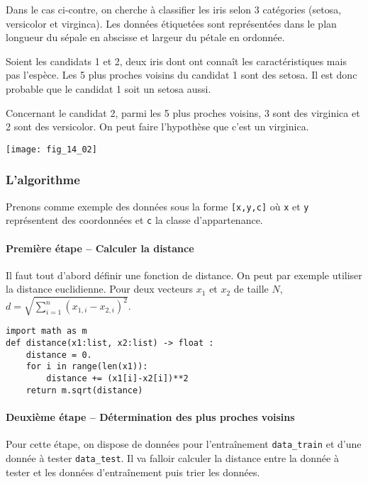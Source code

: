 {\begin{exemple}
\begin{minipage}[c]{.6\linewidth}
Dans le cas ci-contre, on cherche à classifier les iris selon 3 catégories (setosa, versicolor et virginca). Les données étiquetées sont représentées dans le plan longueur du sépale en abscisse et largeur du pétale en ordonnée. 

Soient les candidats 1 et 2, deux iris dont ont connaît les caractéristiques mais pas l'espèce. Les 5 plus proches voisins du candidat 1 sont des setosa. Il est donc probable que le candidat 1 soit un setosa aussi.

Concernant le candidat 2, parmi les 5 plus proches voisins, 3 sont des virginica et 2 sont des versicolor. On peut faire l'hypothèse que c'est un virginica. 
\end{minipage} \hfill
\begin{minipage}[c]{.35\linewidth}
\begin{center}
\texttt{[image: fig\_14\_02]}
\end{center}
\end{minipage} 

\end{exemple}

\subsubsection{L'algorithme}

Prenons comme exemple des données sous la forme \texttt{[x,y,c]} où \texttt{x} et \texttt{y} représentent des coordonnées et \texttt{c} la classe d'appartenance.
\paragraph*{Première étape -- Calculer la distance}

Il faut tout d'abord définir une fonction de distance. On peut par exemple utiliser la distance euclidienne.
Pour deux vecteurs $x_1$ et $x_2$ de taille $N$, 
$d = \sqrt{ \sum\limits_{i=1}^n \left(x_{1,i}-x_{2,i} \right)^2}$.

\begin{lstlisting}
import math as m
def distance(x1:list, x2:list) -> float :
    distance = 0.
    for i in range(len(x1)):
        distance += (x1[i]-x2[i])**2
    return m.sqrt(distance)
\end{lstlisting}

\paragraph*{Deuxième étape -- Détermination des plus proches voisins}
Pour cette étape, on dispose de données pour l’entraînement \texttt{data\_train} et d'une donnée à tester \texttt{data\_test}.
Il va falloir calculer la distance entre la donnée à tester et les données d’entraînement puis trier les données. 

}
